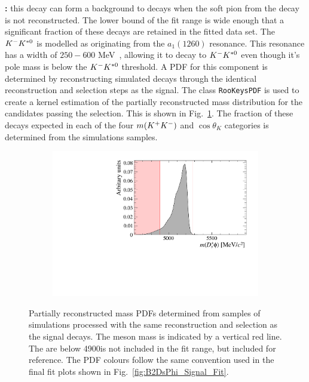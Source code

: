 \begin{description}
\item \textbf{\decay{\Bsb}{\Dsp\Km\Kstarz}:} this decay can form a background to \decay{\Bp}{\Dsp\phiz} decays when the soft pion from the \decay{\Kstarz}{\Kp\pim} decay is not reconstructed. The lower bound of the fit range is wide enough that a significant fraction of these decays are retained in the fitted data set. The ${{K}^-}{{K}^{*0}}$ is modelled as originating from the $a_1(1260)$ resonance. This resonance has a width of $250-600$ MeV~\cite{PDG2016}, allowing it to decay to ${{K}^-}{{K}^{*0}}$ even though it's pole mass is below the ${{K}^-}{{K}^{*0}}$ threshold. A PDF for this component is determined by reconstructing simulated \decay{\Bsb}{\Dsp\Km\Kstarz} decays through the identical reconstruction and selection steps as the signal. The \roofit class \texttt{RooKeysPDF} is used to create a kernel estimation of the partially reconstructed \Bp mass distribution for the candidates passing the selection. This is shown in Fig.~\ref{fig:B2DsPhi_part_reco_shapes_DsKKstar}. The fraction of these decays expected in each of the four $m({{K}^+}{{K}^-})$ and $\cos\theta_{K}$ categories is determined from the simulations samples.
\end{description}

\begin{figure}[!h]
    \centering
    \begin{subfigure}[t]{0.49\textwidth}
        \includegraphics[width=1.0\textwidth]{figs/B2DsPhi/Bs2Dsa1_4600_5900_Shape.pdf}
    \end{subfigure}
    \caption{Partially reconstructed mass PDFs determined from samples of \decay{\Bsb}{\Dsp\Km\Kstarz} simulations processed with the same reconstruction and selection as the signal decays. The \Bp meson mass is indicated by a vertical red line. The are below 4900\mevcc is not included in the fit range, but included for reference. The PDF colours follow the same convention used in the final fit plots shown in Fig.~\ref{fig:B2DsPhi_Signal_Fit}.}
    \label{fig:B2DsPhi_part_reco_shapes_DsKKstar}   
\end{figure}

